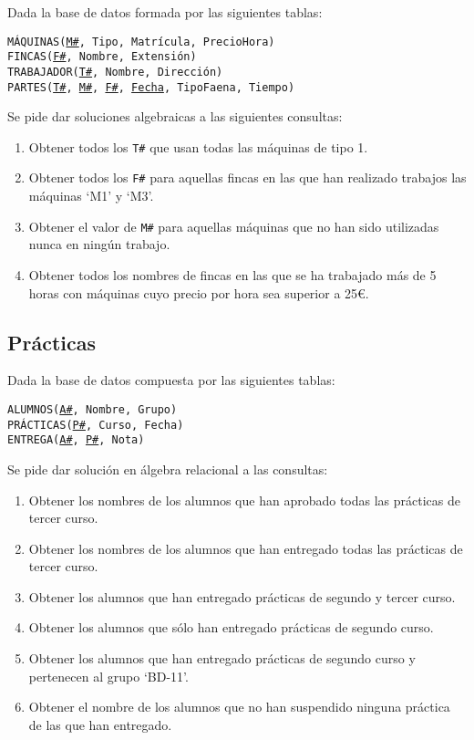 \documentclass{db-practice}
\begin{document}
Dada la base de datos formada por las siguientes tablas:

\begin{addmargin}[1.5em]{0em}
    \texttt{MÁQUINAS(\underline{M\#}, Tipo, Matrícula, PrecioHora)}\\
    \texttt{FINCAS(\underline{F\#}, Nombre, Extensión)}\\
    \texttt{TRABAJADOR(\underline{T\#}, Nombre, Dirección)}\\
    \texttt{PARTES(\underline{T\#}, \underline{M\#}, \underline{F\#}, \underline{Fecha}, TipoFaena, Tiempo)}
\end{addmargin}

Se pide dar soluciones algebraicas a las siguientes consultas:

\begin{enumerate}
    \item Obtener todos los \texttt{T\#} que usan todas las máquinas de tipo 1.
    \item Obtener todos los \texttt{F\#} para aquellas fincas en las que han realizado trabajos las máquinas `M1' y `M3'.
    \item Obtener el valor de \texttt{M\#} para aquellas máquinas que no han sido utilizadas nunca en ningún trabajo.
    \item Obtener todos los nombres de fincas en las que se ha trabajado más de 5 horas con máquinas cuyo precio por hora sea superior a 25€.
\end{enumerate}

\subsection{Prácticas}

Dada la base de datos compuesta por las siguientes tablas:

\begin{addmargin}[1.5em]{0em}
    \texttt{ALUMNOS(\underline{A\#}, Nombre, Grupo)}\\
    \texttt{PRÁCTICAS(\underline{P\#}, Curso, Fecha)}\\
    \texttt{ENTREGA(\underline{A\#}, \underline{P\#}, Nota)}
\end{addmargin}

Se pide dar solución en álgebra relacional a las consultas:

\begin{enumerate}
    \item Obtener los nombres de los alumnos que han aprobado todas las prácticas de tercer curso.
    \item Obtener los nombres de los alumnos que han entregado todas las prácticas de tercer curso.
    \item Obtener los alumnos que han entregado prácticas de segundo y tercer curso.
    \item Obtener los alumnos que sólo han entregado prácticas de segundo curso.
    \item Obtener los alumnos que han entregado prácticas de segundo curso y pertenecen al grupo `BD-11'.
    \item Obtener el nombre de los alumnos que no han suspendido ninguna práctica de las que han entregado.
\end{enumerate}
\end{document}
